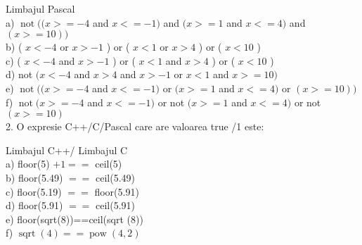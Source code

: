 Limbajul Pascal\\
a) $\operatorname{not}((x>=-4$ and $x<=-1)$ and $(x>=1$ and $x<=4)$ and $(x>=10))$\\
b) ( $x<-4$ or $x>-1$ ) or ( $x<1$ or $x>4$ ) or ( $x<10$ )\\
c) ( $x<-4$ and $x>-1$ ) or ( $x<1$ and $x>4$ ) or ( $x<10$ )\\
d) not $(x<-4$ and $x>4$ and $x>-1$ or $x<1$ and $x>=10)$\\
e) $\operatorname{not}((x>=-4$ and $x<=-1)$ or $(x>=1$ and $x<=4)$ or $(x>=10))$\\
f) $\operatorname{not}(x>=-4$ and $x<=-1)$ or not $(x>=1$ and $x<=4)$ or not $(x>=10)$\\
2. O expresie C++/C/Pascal care are valoarea true /1 este:

Limbajul C++/ Limbajul C\\
a) floor(5) $+1==$ ceil(5)\\
b) floor(5.49) $==$ ceil(5.49)\\
c) floor(5.19) $==$ floor(5.91)\\
d) floor(5.91) $==$ ceil(5.91)\\
e) floor(sqrt(8))==ceil(sqrt (8))\\
f) $\operatorname{sqrt}(4)==\operatorname{pow}(4,2)$

